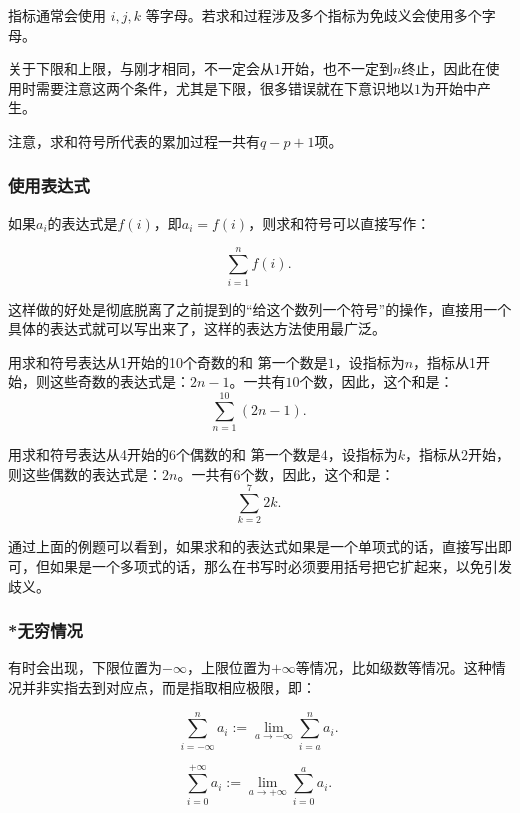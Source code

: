 指标通常会使用 $i,j,k$ 等字母。若求和过程涉及多个指标为免歧义会使用多个字母。

关于下限和上限，与刚才相同，不一定会从$1$开始，也不一定到$n$终止，因此在使用时需要注意这两个条件，尤其是下限，很多错误就在下意识地以$1$为开始中产生。

注意，求和符号所代表的累加过程一共有$q-p+1$项。

\subsubsection{使用表达式}

如果$a_i$的表达式是$f(i)$，即$a_i=f(i)$，则求和符号可以直接写作：

\begin{equation}
\sum_{i=1}^n f(i) .~
\end{equation}

这样做的好处是彻底脱离了之前提到的“给这个数列一个符号”的操作，直接用一个具体的表达式就可以写出来了，这样的表达方法使用最广泛。

\begin{example}{用求和符号表达从1开始的10个奇数的和}
第一个数是$1$，设指标为$n$，指标从1开始，则这些奇数的表达式是：$2n-1$。一共有$10$个数，因此，这个和是：
$$\sum_{n=1}^{10}(2n-1).~$$
\end{example}

\begin{example}{用求和符号表达从4开始的6个偶数的和}
第一个数是$4$，设指标为$k$，指标从$2$开始，则这些偶数的表达式是：$2n$。一共有$6$个数，因此，这个和是：
$$\sum_{k=2}^{7}{2k} .~$$
\end{example}

通过上面的例题可以看到，如果求和的表达式如果是一个单项式的话，直接写出即可，但如果是一个多项式的话，那么在书写时必须要用括号把它扩起来，以免引发歧义。

\subsubsection{*无穷情况}

有时会出现，下限位置为$-\infty$，上限位置为$+\infty$等情况，比如级数等情况。这种情况并非实指去到对应点，而是指取相应极限，即：

\begin{equation}
\sum_{i=-\infty}^n a_i:= \lim_{a\to-\infty}\sum_{i=a}^n a_i.~
\end{equation}

\begin{equation}
\sum_{i=0}^{+\infty} a_i:= \lim_{a\to+\infty}\sum_{i=0}^a a_i.~
\end{equation}

